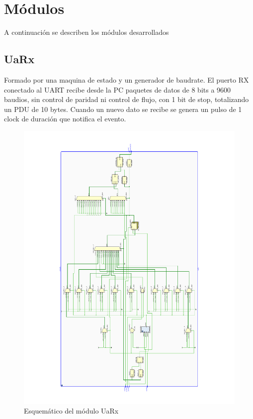 \documentclass[12pt]{article}
\begin{document}
\section{Módulos}
A continuación se describen los módulos desarrollados
\subsection{UaRx}
Formado por una maquina de estado y un generador de baudrate. El puerto RX conectado al UART recibe desde la PC paquetes de datos de 8 bits a 9600 baudios, sin control de paridad ni control de flujo, con 1 bit de stop, totalizando un PDU de 10 bytes. Cuando un nuevo dato se recibe se genera un pulso de 1 clock de duración que notifica el evento.

\begin{figure}[H]
    \centering
    \includegraphics[angle=270, width=\textwidth]{uart-rx}
    \caption{Esquemático del módulo UaRx}
\end{figure}
\end{document}
